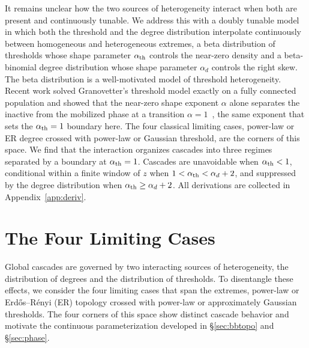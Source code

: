 \documentclass[]{revtex4-2}
\begin{document}
It remains unclear how the two sources of heterogeneity interact when both are present and continuously tunable. We address this with a doubly tunable model in which both the threshold and the degree distribution interpolate continuously between homogeneous and heterogeneous extremes, a beta distribution of thresholds whose shape parameter $\alpha_{\rm th}$ controls the near-zero density and a beta-binomial degree distribution whose shape parameter $\alpha_d$ controls the right skew. The beta distribution is a well-motivated model of threshold heterogeneity. Recent work solved Granovetter's threshold model exactly on a fully connected population and showed that the near-zero shape exponent $\alpha$ alone separates the inactive from the mobilized phase at a transition $\alpha=1$~\citep{Fontanari2026}, the same exponent that sets the $\alpha_{\rm th}=1$ boundary here. The four classical limiting cases, power-law or ER degree crossed with power-law or Gaussian threshold, are the corners of this space. We find that the interaction organizes cascades into three regimes separated by a boundary at $\alpha_{\rm th}=1$. Cascades are unavoidable when $\alpha_{\rm th}<1$, conditional within a finite window of $z$ when $1<\alpha_{\rm th}<\alpha_d+2$, and suppressed by the degree distribution when $\alpha_{\rm th}\ge\alpha_d+2$. All derivations are collected in Appendix~\ref{app:deriv}.


\section{The Four Limiting Cases}
\label{sec:fourcases}

Global cascades are governed by two interacting sources of heterogeneity, the distribution of degrees and the distribution of thresholds. To disentangle these effects, we consider the four limiting cases that span the extremes, power-law or Erd\H{o}s--R\'{e}nyi (ER) topology crossed with power-law or approximately Gaussian thresholds. The four corners of this space show distinct cascade behavior and motivate the continuous parameterization developed in \S\ref{sec:bbtopo} and \S\ref{sec:phase}.
\end{document}
